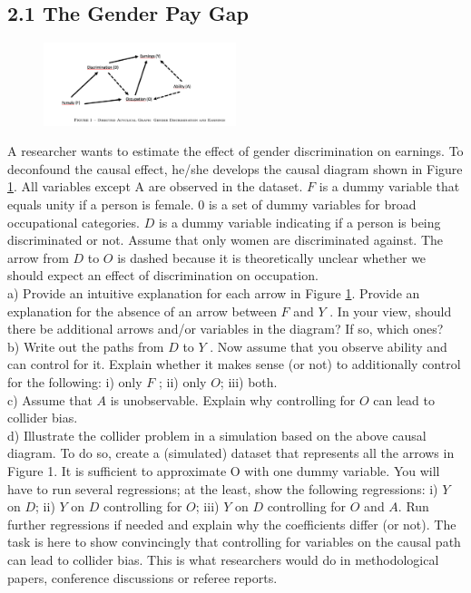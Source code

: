 \documentclass[a4paper,12pt,oneside,English]{article}
\begin{document}
\subsection{2.1 The Gender Pay Gap}
\begin{figure}[h!]
    \centering
    \includegraphics[width=0.5\textwidth]{Image 1.png}
    \caption{}
    \label{fig 1}
\end{figure}
A researcher wants to estimate the effect of gender discrimination on earnings. To deconfound the causal effect, he/she develops the causal diagram shown in Figure \ref{fig 1}. All variables except A are observed in the dataset. $F$ is a dummy variable that equals unity if a person is female. $0$ is a set of dummy variables for broad occupational categories. $D$ is a dummy variable indicating if a person is being discriminated or not. Assume that only women are discriminated against. The arrow from $D$ to $O$ is dashed because it is theoretically unclear whether we should expect an effect of discrimination on occupation.\\
a) Provide an intuitive explanation for each arrow in Figure \ref{fig 1}. Provide an explanation for the absence of an arrow between $F$ and $Y$ . In your view, should there be additional arrows and/or variables in the diagram? If so, which ones?\\
b) Write out the paths from $D$ to $Y$ . Now assume that you observe ability and can control for it. Explain whether it makes sense (or not) to additionally control for the following: i) only $F$ ; ii) only $O$; iii) both.\\
c) Assume that $A$ is unobservable. Explain why controlling for $O$ can lead to collider bias.\\
d) Illustrate the collider problem in a simulation based on the above causal diagram. To do so, create a (simulated) dataset that represents all the arrows in Figure 1. It is sufficient to approximate O with one dummy variable. You will have to run several regressions; at the least, show the following regressions: i) $Y$ on $D$; ii) $Y$ on $D$ controlling for $O$; iii) $Y$ on $D$ controlling for $O$ and $A$. Run further regressions if needed and explain why the coefficients differ (or not). The task is here to show convincingly that controlling for variables on the causal path can lead to collider bias. This is what researchers would do in methodological papers, conference discussions or referee reports.\\
\newpage
\end{document}
